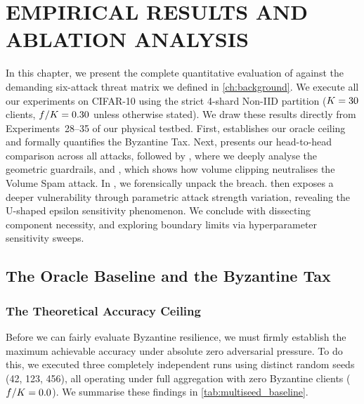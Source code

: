 \documentclass[../main.tex]{subfiles}
\begin{document}
\chapter{EMPIRICAL RESULTS AND ABLATION ANALYSIS}
\label{ch:results}

In this chapter, we present the complete quantitative evaluation of \aegis{} against the demanding six-attack threat matrix we defined in \cref{ch:background}. We execute all our experiments on CIFAR-10 using the strict 4-shard Non-IID partition ($K=30$ clients, $f/K=0.30$ unless otherwise stated). We draw these results directly from Experiments~28--35 of our physical testbed. First,  establishes our oracle ceiling and formally quantifies the Byzantine Tax. Next,  presents our head-to-head comparison across all attacks, followed by , where we deeply analyse the geometric guardrails, and , which shows how volume clipping neutralises the Volume Spam attack. In , we forensically unpack the \ipm{} breach.  then exposes a deeper vulnerability through parametric attack strength variation, revealing the U-shaped epsilon sensitivity phenomenon. We conclude with  dissecting component necessity, and  exploring boundary limits via hyperparameter sensitivity sweeps.

\section{The Oracle Baseline and the Byzantine Tax}
\label{sec:results_baseline}

\subsection{The Theoretical Accuracy Ceiling}
\label{sec:results_ceiling}

Before we can fairly evaluate Byzantine resilience, we must firmly establish the maximum achievable accuracy under absolute zero adversarial pressure. To do this, we executed three completely independent runs using distinct random seeds (42, 123, 456), all operating under full \aegis{} aggregation with zero Byzantine clients ($f/K = 0.0$). We summarise these findings in \cref{tab:multiseed_baseline}.
\end{document}
